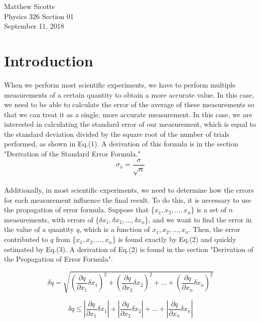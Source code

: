\documentclass[leqno]{article}
\begin{document}
\begin{flushright}
Matthew Sicotte\\
Physics 326 Section 01\\
September 11, 2018
\end{flushright}
\section*{Introduction}
When we perform most scientific experiments, we have to perform multiple measurements of a certain quantity to obtain a more accurate value.  In this case, we need to be able to calculate the error of the average of these measurements so that we can treat it as a single, more accurate measurement.  In this case, we are interested in calculating the standard error of our measurement, which is equal to the standard deviation divided by the square root of the number of trials performed, as shown in Eq.(1).  A derivation of this formula is in the section "Derivation of the Standard Error Formula."\\

\begin{equation}
	\sigma_{\bar{x}}=\frac{\sigma}{\sqrt{n}}
\end{equation}\\


Additionally, in most scientific experiments, we need to determine how the errors for each measurement influence the final result.  To do this, it is necessary to use the propagation of error formula.  Suppose that \{$x_1, x_2, \ldots, x_n$\} is a set of $n$ measurements, with errors of \{$\delta x_1, \delta x_2, \ldots, \delta x_n$\}, and we want to find the error in the value of a quantity $q$, which is a function of $x_1, x_2, \ldots, x_n$.  Then, the error contributed to $q$ from \{$x_1, x_2, \ldots, x_n$\} is found exactly by Eq.(2) and quickly estimated by Eq.(3).  A derivation of Eq.(2) is found in the section "Derivation of the Propagation of Error Formula".

\begin{equation}
	\delta q=\sqrt{(\frac{\partial q}{\partial x_1}\delta x_1)^2+(\frac{\partial q}{\partial x_2}\delta x_2)^2+\ldots+(\frac{\partial q}{\partial x_n}\delta x_n)^2}
\end{equation}

\begin{equation}
	\delta q \leq |\frac{\partial q}{\partial x_1}\delta x_1|+|\frac{\partial q}{\partial x_2}\delta x_2|+\ldots + |\frac{\partial q}{\partial x_n}\delta x_n|
\end{equation}
\end{document}
